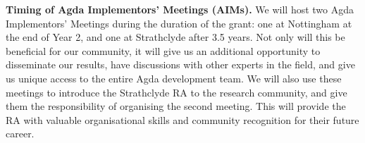 \documentclass[a4paper,11pt]{article}
\renewcommand{\paragraph}[1]{\textbf{#1.}}
\begin{document}
\paragraph{Timing of Agda Implementors' Meetings (AIMs)}
%
We will host two Agda Implementors' Meetings during the duration of the grant: one at Nottingham at the end of Year 2, and one at Strathclyde after 3.5 years.
%
Not only will this be beneficial for our community, it will give us an additional opportunity to disseminate our results, have discussions with other experts in the field, and give us unique access to the entire Agda development team.
%
We will also use these meetings to introduce the Strathclyde RA to the research community, and give them the responsibility of organising the second meeting.
%
This will provide the RA with valuable organisational skills and community recognition
for
their future career.



\end{document}
